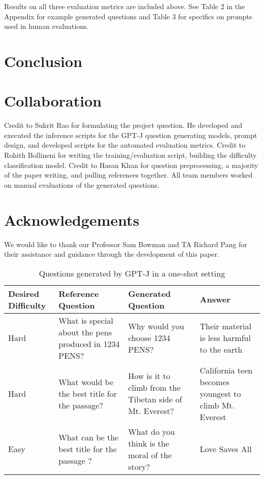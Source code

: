 \documentclass[11pt]{article}
\begin{document}
Results on all three evaluation metrics are included above. See Table 2 in the Appendix for example generated questions and Table 3 for specifics on prompts used in human evaluations.

\section{Conclusion}

\section{Collaboration}
Credit to Sukrit Rao for formulating the project question. He developed and executed the inference scripts for the GPT-J question generating models, prompt design, and developed scripts for the automated evaluation metrics.
Credit to Rohith Bollineni for writing the training/evaluation script, building the difficulty classification model.
Credit to Hasan Khan for question preprocessing, a majority of the paper writing, and pulling references together. All team members worked on manual evaluations of the generated questions. 




\section*{Acknowledgements}

We would like to thank our Professor Sam Bowman and TA Richard Pang for their assistance and guidance through the development of this paper.

\newpage



\clearpage


\begin{table*}[!hbt]
    \centering
    \begin{tabular}{|p{3cm}|p{4cm}|p{4cm}|p{3.5cm}|}
        \hline
        \textbf{Desired Difficulty} & \textbf{Reference Question} & \textbf{Generated Question} & \textbf{Answer}\\
        \hline
        Hard & 
        What is special about the pens produced in 1234 PENS? & 
        Why would you choose 1234 PENS? &  
        Their material is less harmful to the earth\\
        \hline
        Hard & 
        What would be the best title for the passage?  & 
        How is it to climb from the Tibetan side of Mt. Everest? & 
        California teen becomes youngest to climb Mt. Everest\\
        \hline
        Easy & 
        What can be the best title for the passage ? & 
        What do you think is the moral of the story? & 
        Love Saves All\\
        \hline
    \end{tabular}
    \caption{\label{citation-guide}
    Questions generated by GPT-J in a one-shot setting}
    \end{table*}
\end{document}
